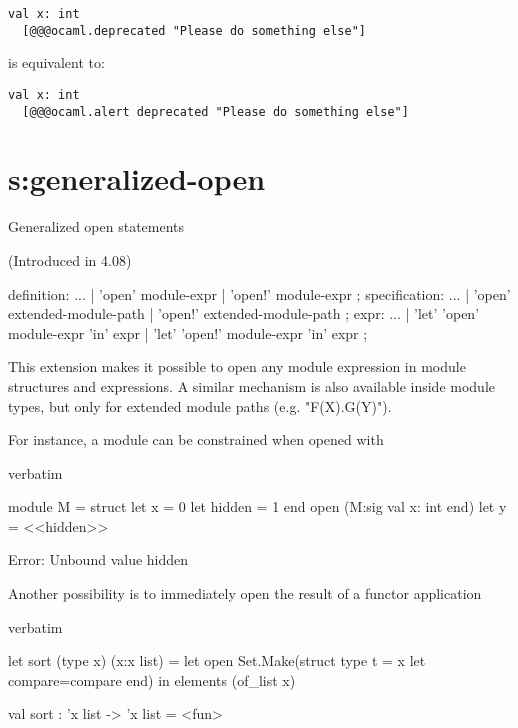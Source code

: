 {\begin{verbatim}
val x: int
  [@@@ocaml.deprecated "Please do something else"]
\end{verbatim}

is equivalent to:

\begin{verbatim}
val x: int
  [@@@ocaml.alert deprecated "Please do something else"]
\end{verbatim}

\section{s:generalized-open}{Generalized open statements}

(Introduced in 4.08)

\begin{syntax}
definition:
      ...
   |  'open'  module-expr
   |  'open!' module-expr
;
specification:
      ...
   |  'open'  extended-module-path
   |  'open!' extended-module-path
;
expr:
       ...
     | 'let' 'open'  module-expr 'in' expr
     | 'let' 'open!' module-expr 'in' expr
;
\end{syntax}


This extension makes it possible to open any module expression in
module structures and expressions. A similar mechanism is also available
inside module types, but only for extended module paths (e.g. "F(X).G(Y)").

For instance, a module can be constrained when opened with

\begin{camlexample}{verbatim}
\begin{caml}
\begin{camlinput}
module M = struct let x = 0 let hidden = 1 end
open (M:sig val x: int end)
let y = <<hidden>>
\end{camlinput}
\begin{camlerror}
Error: Unbound value hidden
\end{camlerror}
\end{caml}
\end{camlexample}


Another possibility is to immediately open the result of a functor application

\begin{camlexample}{verbatim}
\begin{caml}
\begin{camlinput}
  let sort (type x) (x:x list) =
    let open Set.Make(struct type t = x let compare=compare end) in
    elements (of_list x)
\end{camlinput}
\begin{camloutput}
val sort : 'x list -> 'x list = <fun>
\end{camloutput}
\end{caml}
\end{camlexample}

}
